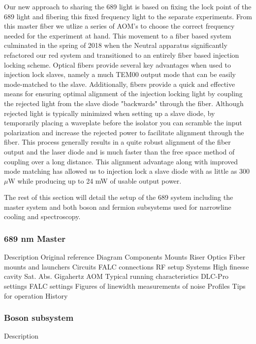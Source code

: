 Our new approach to sharing the 689 light is based on fixing the lock point of the 689 light and fibering this fixed frequency light to the separate experiments. From this master fiber we utlize a series of AOM's to choose the correct frequency needed for the experiment at hand. This movement to a fiber based system culminated in the spring of 2018 when the Neutral apparatus significantly refactored our red system and transitioned to an entirely fiber based injection locking scheme. Optical fibers provide several key advantages when used to injection lock slaves, namely a much TEM00 output mode that can be easily mode-matched to the slave. Additionally, fibers provide a quick and effective means for ensuring optimal alignment of the injection locking light by coupling the rejected light from the slave diode "backwards" through the fiber. Although rejected light is typically minimized when setting up a slave diode, by temporarily placing a waveplate before the isolator you can scramble the input polarization and increase the rejected power to facilitate alignment through the fiber. This process generally results in a quite robust alignment of the fiber output and the laser diode and is much faster than the free space method of coupling over a long distance. This alignment advantage along with improved mode matching has allowed us to injection lock a slave diode with as little as 300 $\mu$W while producing up to 24 mW of usable output power.

The rest of this section will detail the setup of the 689 system including the master system and both boson and fermion subsystems used for narrowline cooling and spectroscopy.
	
\subsubsection{689 nm Master}

Description
	Original reference
Diagram
Components
	Mounts
		Riser
	Optics
		Fiber mounts and launchers
	Circuits
		FALC connections
		RF setup
	Systems
		High finesse cavity
		Sat. Abs. 
		Gigahertz AOM
Typical running characteristics
	DLC-Pro settings
	FALC settings
		Figures of linewidth
		measurements of noise
Profiles
Tips for operation
History

\subsubsection{Boson subsystem}

Description


